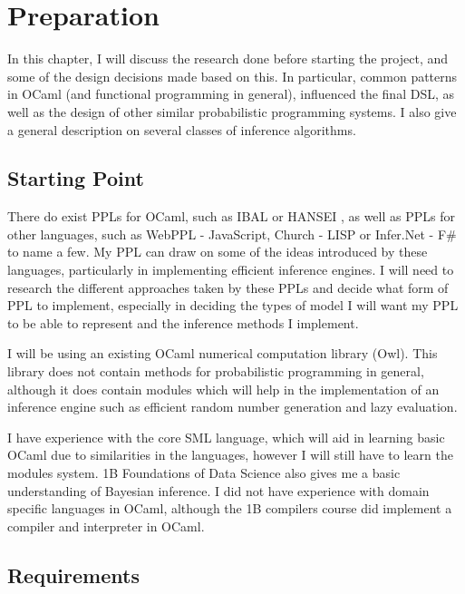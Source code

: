 \chapter{Preparation}

In this chapter, I will discuss the research done before starting the project, and some of the design decisions made based on this. In particular, common patterns in OCaml (and functional programming in general), influenced the final DSL, as well as the design of other similar probabilistic programming systems. I also give a general description on several classes of inference algorithms.

\section{Starting Point}

There do exist PPLs for OCaml, such as IBAL \cite{ibal} or HANSEI \cite{kiselyov2009embedded}, as well as PPLs for other languages, such as WebPPL - JavaScript\cite{mobus2018structure}, Church - LISP\cite{goodman2012church} or Infer.Net - F\#\cite{wang2011using} to name a few. My PPL can draw on some of the ideas introduced by these languages, particularly in implementing efficient inference engines. I will need to research the different approaches taken by these PPLs and decide what form of PPL to implement, especially in deciding the types of model I will want my PPL to be able to represent and the inference methods I implement.

I will be using an existing OCaml numerical computation library (Owl). This library does not contain methods for probabilistic programming in general, although it does contain modules which will help in the implementation of an inference engine such as efficient random number generation and lazy evaluation.

I have experience with the core SML language, which will aid in learning basic OCaml due to similarities in the languages, however I will still have to learn the modules system. 1B Foundations of Data Science also gives me a basic understanding of Bayesian inference. I did not have experience with domain specific languages in OCaml, although the 1B compilers course did implement a compiler and interpreter in OCaml.


\section{Requirements}

